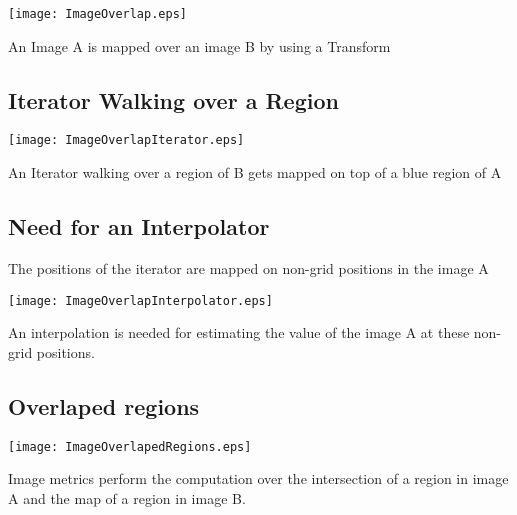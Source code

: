 \texttt{[image: ImageOverlap.eps]}

An Image A is mapped over an image B by using a Transform


\subsection{Iterator Walking over a Region}

\texttt{[image: ImageOverlapIterator.eps]} 

An Iterator walking over a region of
B gets mapped on top of a blue region of A

\subsection{Need for an Interpolator}

The positions of the iterator are mapped
on non-grid positions in the image A 

\texttt{[image: ImageOverlapInterpolator.eps]}

An interpolation is needed for estimating
the value of the image A at these non-grid positions.


\subsection{Overlaped regions }

\texttt{[image: ImageOverlapedRegions.eps]}

Image metrics perform the computation over the intersection of a region in
image A and the map of a region in image B.


